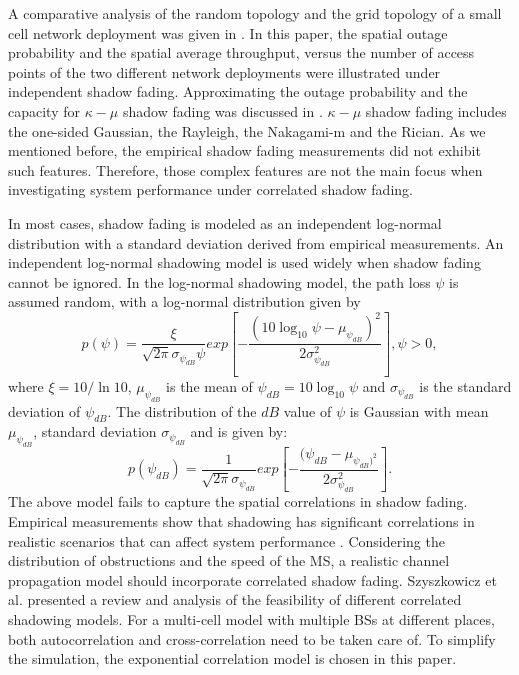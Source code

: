 \documentclass[journal,10pt]{IEEEtran}
\begin{document}
\par A comparative analysis of the random topology and the grid topology of a small cell network deployment was given in \cite{chen2012small}. In this paper, the spatial outage probability and the spatial average throughput, versus the number of access points of the two different network deployments were illustrated under independent shadow fading. Approximating the outage probability and the capacity for $\kappa-\mu$ shadow fading was discussed in \cite{kumar2015approximate}. $\kappa-\mu$ shadow fading includes the one-sided Gaussian, the Rayleigh, the Nakagami-m and the Rician. As we mentioned before, the empirical shadow fading measurements did not exhibit such features. Therefore, those complex features are not the main focus when investigating system performance under correlated shadow fading.
\par In most cases, shadow fading is modeled as an independent log-normal distribution \cite{goldsmith2005wireless} with a standard deviation derived from empirical measurements. An independent log-normal shadowing model is used widely when shadow fading cannot be ignored. In the log-normal shadowing model, the path loss $\psi$ is assumed random, with a log-normal distribution given by
\begin{equation}
p(\psi)=\frac{\xi}{\sqrt{2\pi}\sigma_{\psi_{dB}}\psi}exp[-\frac{(10\log_{10}\psi-\mu_{\psi_{dB}})^{2}}{2\sigma_{\psi_{dB}}^{2}}], \psi>0,
\end{equation}
where $\xi=10/\ln10$, $\mu_{\psi_{dB}}$ is the mean of $\psi_{dB}=10\log_{10}\psi$ and $\sigma_{\psi_{dB}}$ is the standard deviation of $\psi_{dB}$.
The distribution of the $dB$ value of $\psi$ is Gaussian with mean $\mu_{\psi_{dB}}$, standard deviation $\sigma_{\psi_{dB}}$ and is given by:
\begin{equation}
p(\psi_{dB})=\frac{1}{\sqrt{2\pi}\sigma_{\psi_{dB}}}exp[-\frac{(\psi_{dB}-\mu_{\psi_{dB})^2}}{2\sigma_{\psi_{dB}}^2}].
\end{equation}
The above model fails to capture the spatial correlations in shadow fading. Empirical measurements show that shadowing has significant correlations in realistic scenarios that can affect system performance \cite{graziano1978propagation}. Considering the distribution of obstructions and the speed of the MS, a realistic channel propagation model should incorporate correlated shadow fading.  Szyszkowicz et al. \cite{szyszkowicz2010feasibility} presented a review and analysis of the feasibility of different correlated shadowing models. For a multi-cell model with multiple BSs at different places, both autocorrelation and cross-correlation need to be taken care of. To simplify the simulation, the exponential correlation model is chosen in this paper.
\end{document}
